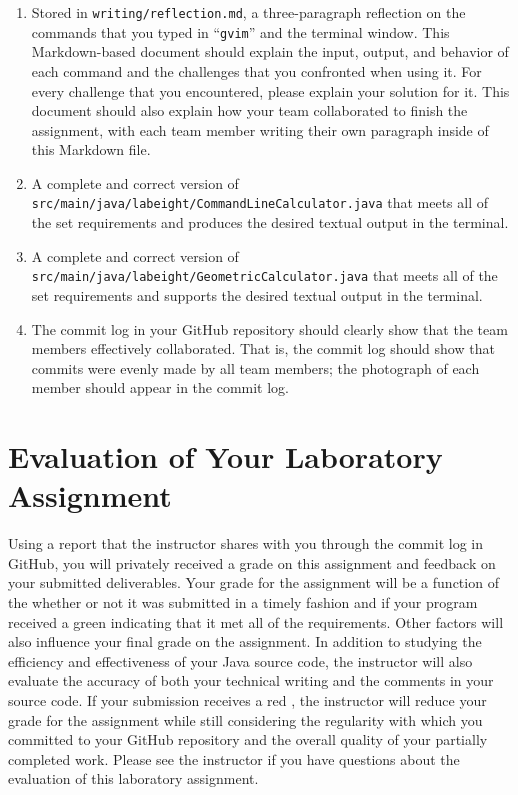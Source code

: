 \documentclass[11pt]{article}
\newcommand{\mainprogramsource}{\lstinline{src/main/java/labeight/CommandLineCalculator.java}}
\newcommand{\secondprogramsource}{\lstinline{src/main/java/labeight/GeometricCalculator.java}}
\newcommand{\reflection}{\lstinline{writing/reflection.md}}
\newcommand{\command}[1]{``\lstinline{#1}''}
\newcommand{\checkmark}{\ding{51}}
\newcommand{\naughtmark}{\ding{55}}
\begin{document}
\begin{enumerate}

  \setlength{\itemsep}{0in}

\item Stored in \reflection{}, a three-paragraph reflection on the commands that you typed in \command{gvim} and the
  terminal window. This Markdown-based document should explain the input, output, and behavior of each command and the
  challenges that you confronted when using it. For every challenge that you encountered, please explain your solution
  for it. This document should also explain how your team collaborated to finish the assignment, with each team member
  writing their own paragraph inside of this Markdown file.

\item A complete and correct version of \mainprogramsource{} that meets all of the set requirements and produces the
  desired textual output in the terminal.

\item A complete and correct version of \secondprogramsource{} that meets all of the set requirements and supports the
  desired textual output in the terminal.

\item The commit log in your GitHub repository should clearly show that the team members effectively collaborated. That
  is, the commit log should show that commits were evenly made by all team members; the photograph of each member should
  appear in the commit log.

\end{enumerate}

\section*{Evaluation of Your Laboratory Assignment}

Using a report that the instructor shares with you through the commit log in GitHub, you will privately received a grade
on this assignment and feedback on your submitted deliverables. Your grade for the assignment will be a function of the
whether or not it was submitted in a timely fashion and if your program received a green \checkmark{} indicating that it
met all of the requirements. Other factors will also influence your final grade on the assignment. In addition to
studying the efficiency and effectiveness of your Java source code, the instructor will also evaluate the accuracy of
both your technical writing and the comments in your source code. If your submission receives a red \naughtmark{}, the
instructor will reduce your grade for the assignment while still considering the regularity with which you committed to
your GitHub repository and the overall quality of your partially completed work. Please see the instructor if you have
questions about the evaluation of this laboratory assignment.
\end{document}
